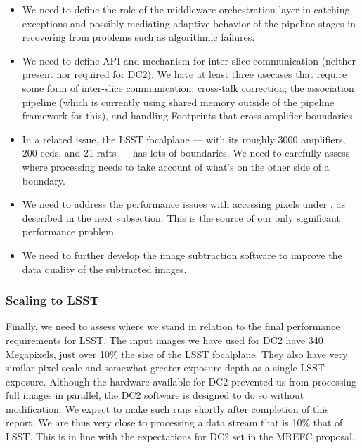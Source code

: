 \begin{itemize}

\item We need to define the role of the middleware orchestration layer in catching exceptions and possibly mediating adaptive behavior of the pipeline stages in recovering from problems such as algorithmic failures.

\item We need to define API and mechanism for inter-slice communication (neither present nor required for DC2).  We have at least three usecases that require some form of inter-slice communication: cross-talk correction; the association pipeline (which is currently using shared memory outside of the pipeline framework for this), and handling Footprints that cross amplifier boundaries.

\item In a related issue, the LSST focalplane --- with its roughly 3000 amplifiers, 200 ccds, and 21 rafts --- has lots of boundaries. We need to carefully assess where processing needs to take account of what's on the other side of a boundary.

\item We need to address the performance issues with accessing pixels under , as described in the next subsection.  This is the source of our only significant performance problem.

\item We need to further develop the image subtraction software to improve the data quality of the subtracted images.

\end{itemize}

\subsubsection*{Scaling to LSST}

Finally, we need to assess where we stand in relation to the final performance requirements for LSST.  The input images we have used for DC2 have 340 Megapixels, just over 10\% the size of the LSST focalplane.  They also have very similar pixel scale and somewhat greater exposure depth as a single LSST exposure.  Although the hardware available for DC2 prevented us from processing full images in parallel, the DC2 software is designed to do so without modification. We expect to make such runs shortly after completion of this report. We are thus very close to processing a data stream that is 10\% that of LSST.  This is in line with the expectations for DC2 set in the MREFC proposal.

